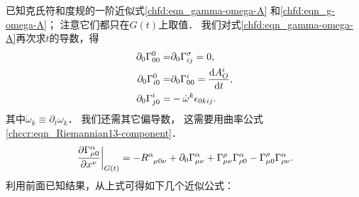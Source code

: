 已知克氏符和度规的一阶近似式\eqref{chfd:eqn_gamma-omega-A}
和\eqref{chfd:eqn_g-omega-A}；
注意它们都只在$G(t)$上取值．
我们对式\eqref{chfd:eqn_gamma-omega-A}再次求$t$的导数，得
\begin{subequations}\label{chfd:eqn_gamma-dd}
    \begin{align}
        \partial_0 \Gamma^0_{00} =& \partial_0 \Gamma^\sigma_{ij} = 0, \\
        \partial_0 \Gamma^0_{i0} =& \partial_0 \Gamma^i_{00} =\frac{{\rm d}A_{O}^i}{{\rm d}t} , \\
        \partial_0 \Gamma^i_{j0} =& -\dot{\omega}^k \epsilon_{0kij} .
    \end{align}
\end{subequations}
其中$\dot{\omega}_k\equiv \partial_t {\omega}_k$．
我们还需其它偏导数，
这需要用曲率公式\eqref{chccr:eqn_Riemannian13-component}．
\begin{equation}
    \left.\frac{\partial \Gamma_{\mu 0}^\alpha}{\partial x^\nu} \right|_{G(t)}
    = -R_{\hphantom{\alpha} \mu 0 \nu}^\alpha +{\partial_0} \Gamma_{\mu\nu}^{\alpha}
    + \Gamma_{\mu\nu}^{\rho} \Gamma_{\rho 0}^{\alpha}
    - \Gamma_{\mu 0}^{\rho} \Gamma_{\rho \nu}^{\alpha} .
\end{equation}
利用前面已知结果，从上式可得如下几个近似公式：
